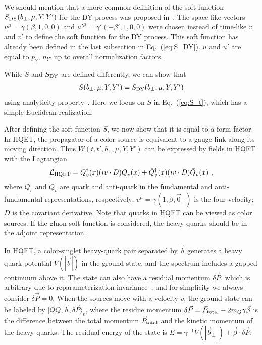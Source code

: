 \documentclass[aps,rmp,reprint,amsmath,amssymb,graphicx,longbibliography]{revtex4-1} %
\begin{document}
We should mention that a more common definition of the soft function $S_{\rm DY}(b_\perp,\mu,Y,Y')$ for the DY process was proposed in~\cite{Collins:2011ca,Collins:2011zzd}. The space-like vectors $u^\mu=\gamma(\beta,1,0,0)$ and $u'^\mu=\gamma'(-\beta',1,0,0)$ were chosen instead of time-like $v $ and $v'$ to define the soft function for the DY process. This soft function has already been defined in the last subsection in Eq.~(\ref{eq:S_DY}). $u$ and $u'$ are equal to $p_Y$, $n_{Y'}$ up to overall normalization factors.

While $S$ and $S_{\rm DY}$ are defined differently, we can show that
\begin{align}\label{eq:S_t=S}
	S(b_\perp,\mu,Y,Y')=S_{\rm DY}(b_\perp,\mu,Y,Y')
\end{align}
using analyticity property~\cite{future}. Here we focus on $S$ in Eq.~(\ref{eq:S_t}), which has a simple Euclidean realization.

After defining the soft function $S$, we now show that it is equal to a form factor. In HQET, the propagator of a color source is equivalent to a gauge-link along its moving direction.
%
Thus $W(t,t',b_\perp,\mu,Y,Y')$ can be expressed by fields in HQET with the Lagrangian
\begin{align}
	{\cal L_{\rm HQET}}=Q_v^{\dagger}(x)(iv \cdot D)Q_v(x)+ \bar Q_v^{\dagger}(x)(iv \cdot D)\bar Q_v(x) \ ,
\end{align}
where $Q_v$ and $\bar Q_v$ are quark and anti-quark in the fundamental and anti-fundamental representations, respectively; $v^\mu=\gamma(1,\beta,\vec 0_\perp)$ is the four velocity; $D$ is the covariant derivative.
%
Note that quarks in HQET can be viewed as color sources.
%
If the gluon soft function is considered, the heavy quarks should be in the adjoint representation.


In HQET, a color-singlet heavy-quark pair separated by $\vec b$ generates a heavy quark potential $V(|\vec b|)$ in the ground state, and the spectrum includes a gapped continuum above it.
%
The state can also have a residual momentum $\delta\vec P$, which is arbitrary due to reparameterization invariance~\cite{Luke:1992cs,Manohar:2000dt}, and for simplicity we always consider $\delta\vec P=0$.
%
When the sources move with a velocity $v$, the ground state can be labeled by
$|\overline Q Q,\vec{b},\delta \vec P\rangle_v$, where the residue momentum $\delta\vec P=\vec{P}_{\rm total}-2m_Q\gamma\vec\beta$ is the difference between the total momentum $\vec{P}_{\rm total}$ and the kinetic momentum of the heavy-quarks.
%
The residual energy of the state is $E=\gamma^{-1}V(|\vec b_{\perp}|)+\vec{\beta}\cdot \delta\vec P$.
\end{document}
